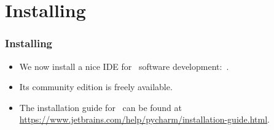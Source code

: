 \documentclass[aspectratio=169,mathserif,notheorems]{beamer}%
\begin{document}
\begin{frame}[fragile,t]
\end{frame}
%
\section{Installing \pycharm}%
%
\begin{frame}%
\frametitle{Installing \pycharm}%
\begin{itemize}%
\item We now install a nice IDE for \python\ software development:~\pycharm.%
\item<2-> Its community edition is freely available.%
\item<3-> The installation guide for \pycharm\ can be found at \url{https://www.jetbrains.com/help/pycharm/installation-guide.html}.%
\end{itemize}%
\end{frame}%
%
\end{document}
